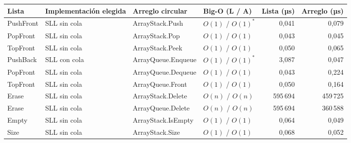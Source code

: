 \begin{tabular}{llllrr}
\toprule
\textbf{Lista} & \textbf{Implementación elegida} & \textbf{Arreglo circular} & \textbf{Big-O (L / A)} & \textbf{Lista (µs)} & \textbf{Arreglo (µs)} \\
\midrule
PushFront & SLL sin cola & ArrayStack.Push & $O(1)$ / $O(1)^{*}$ & 0{,}041 & 0{,}079 \\
PopFront & SLL sin cola & ArrayStack.Pop & $O(1)$ / $O(1)$ & 0{,}043 & 0{,}045 \\
TopFront & SLL sin cola & ArrayStack.Peek & $O(1)$ / $O(1)$ & 0{,}050 & 0{,}065 \\
PushBack & SLL con cola & ArrayQueue.Enqueue & $O(1)$ / $O(1)^{*}$ & 3{,}087 & 0{,}047 \\
PopFront & SLL sin cola & ArrayQueue.Dequeue & $O(1)$ / $O(1)$ & 0{,}043 & 0{,}224 \\
TopFront & SLL sin cola & ArrayQueue.Front & $O(1)$ / $O(1)$ & 0{,}050 & 0{,}164 \\
Erase & SLL sin cola & ArrayStack.Delete & $O(n)$ / $O(n)$ & 595\,694 & 459\,725 \\
Erase & SLL sin cola & ArrayQueue.Delete & $O(n)$ / $O(n)$ & 595\,694 & 360\,588 \\
Empty & SLL sin cola & ArrayStack.IsEmpty & $O(1)$ / $O(1)$ & 0{,}064 & 0{,}049 \\
Size & SLL sin cola & ArrayStack.Size & $O(1)$ / $O(1)$ & 0{,}068 & 0{,}052 \\
\bottomrule
\end{tabular}